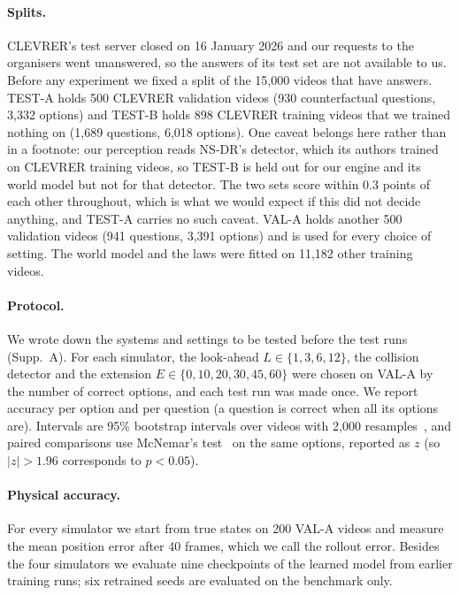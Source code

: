 \documentclass[10pt,twocolumn,letterpaper]{article}
\begin{document}
\paragraph{Splits.}
CLEVRER's test server closed on 16 January 2026 and our requests to the organisers went unanswered, so the answers of its test set are not available to us.
Before any experiment we fixed a split of the 15,000 videos that have answers.
TEST-A holds 500 CLEVRER validation videos (930 counterfactual questions, 3,332 options) and TEST-B holds 898 CLEVRER training videos that we trained nothing on (1,689 questions, 6,018 options).
One caveat belongs here rather than in a footnote: our perception reads NS-DR's detector, which its authors trained on CLEVRER training videos, so TEST-B is held out for our engine and its world model but not for that detector.
The two sets score within 0.3 points of each other throughout, which is what we would expect if this did not decide anything, and TEST-A carries no such caveat.
VAL-A holds another 500 validation videos (941 questions, 3,391 options) and is used for every choice of setting.
The world model and the laws were fitted on 11,182 other training videos.

\paragraph{Protocol.}
We wrote down the systems and settings to be tested before the test runs (Supp.~A).
For each simulator, the look-ahead $L \in \{1,3,6,12\}$, the collision detector and the extension $E \in \{0,10,20,30,45,60\}$ were chosen on VAL-A by the number of correct options, and each test run was made once.
We report accuracy per option and per question (a question is correct when all its options are).
Intervals are 95\% bootstrap intervals over videos with 2,000 resamples~\cite{efron1993bootstrap}, and paired comparisons use McNemar's test~\cite{mcnemar1947note} on the same options, reported as $z$ (so $|z|>1.96$ corresponds to $p<0.05$).

\paragraph{Physical accuracy.}
For every simulator we start from true states on 200 VAL-A videos and measure the mean position error after 40 frames, which we call the rollout error.
Besides the four simulators we evaluate nine checkpoints of the learned model from earlier training runs; six retrained seeds are evaluated on the benchmark only.
\end{document}
